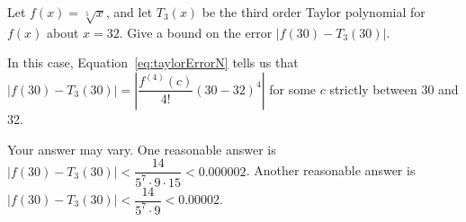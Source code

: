\begin{question}
Let $f(x)=\sqrt[5]{x}$, and let $T_3(x)$ be the third order Taylor polynomial for $f(x)$ about $x=32$. Give a bound on the error $|f(30)-T_3(30)|$.
\end{question}
\begin{hint}
In this case, Equation~\ref*{eq:taylorErrorN} tells us that
$\left|f(30)-T_3(30)\right| = \left|\dfrac{f^{(4)}(c)}{4!}(30-32)^{4}\right|$ for some $c$ strictly between 30 and 32.

\end{hint}
\begin{answer}
Your answer may vary. One reasonable answer is\\
$\left|f(30)-T_3(30)\right|<\dfrac{14}{5^7\cdot9\cdot15}<0.000002$. Another reasonable answer is\\
$\left|f(30)-T_3(30)\right|<\dfrac{14}{5^7\cdot9}<0.00002$.
\end{answer}
